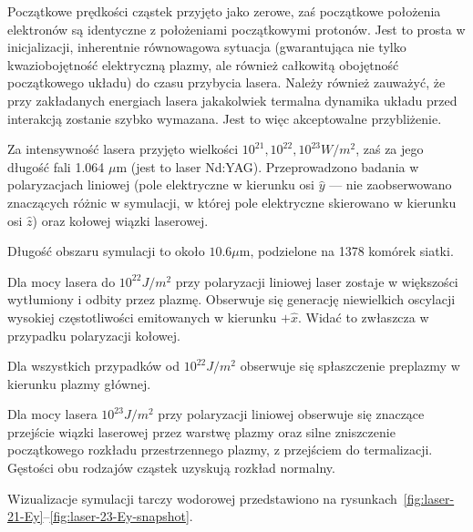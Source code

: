Początkowe prędkości cząstek przyjęto jako zerowe, zaś początkowe położenia
elektronów są identyczne z położeniami początkowymi protonów. Jest to prosta
w inicjalizacji, inherentnie równowagowa sytuacja (gwarantująca nie tylko
kwaziobojętność elektryczną plazmy, ale również całkowitą obojętność
początkowego układu) do czasu przybycia lasera. Należy również zauważyć, że
przy zakładanych energiach lasera jakakolwiek termalna dynamika układu przed
interakcją zostanie szybko wymazana. Jest to więc akceptowalne przybliżenie.

Za intensywność lasera przyjęto wielkości $10^{21}, 10^{22}, 10^{23} W/m^2$,
zaś za jego długość fali 1.064 $\mu$m (jest to laser Nd:YAG). Przeprowadzono
badania w polaryzacjach liniowej (pole elektryczne w kierunku osi $\hat{y}$ ---
nie zaobserwowano znaczących różnic w symulacji, w której pole elektryczne
skierowano w kierunku osi $\hat{z}$)
oraz kołowej wiązki laserowej.

Długość obszaru symulacji to około $10.6 \mu$m, podzielone na 1378 komórek siatki.

Dla mocy lasera do $10^{22} J/m^2$ przy polaryzacji liniowej %
laser zostaje w większości wytłumiony i odbity przez plazmę. Obserwuje się generację niewielkich oscylacji wysokiej częstotliwości emitowanych w kierunku $+\hat{x}$.
Widać to zwłaszcza w przypadku polaryzacji kołowej.

Dla wszystkich przypadków od $10^{22} J/m^2$ obserwuje się spłaszczenie preplazmy w kierunku plazmy głównej.



Dla mocy lasera $10^{23} J/m^2$ przy polaryzacji liniowej %
obserwuje się znaczące przejście wiązki laserowej przez warstwę plazmy oraz silne zniszczenie początkowego rozkładu przestrzennego plazmy, z przejściem do termalizacji.
Gęstości obu rodzajów cząstek uzyskują rozkład normalny.

Wizualizacje symulacji tarczy wodorowej przedstawiono na rysunkach~\ref{fig:laser-21-Ey}--\ref{fig:laser-23-Ey-snapshot}.






